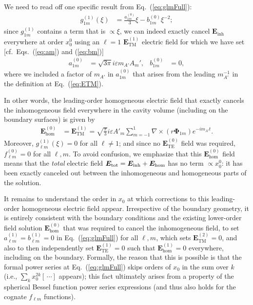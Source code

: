 \documentclass[amsmath,amssymb,aps,10pt,prd,letterpaper,nofootinbib,balancelastpage,notitlepage,superscriptaddress,twocolumn,floatfix]{revtex4-2}
\renewcommand{\eqref}[2][]{Eq{#1}.~(\ref{eq:#2})}	%
\begin{document}
We need to read off one specific result from \eqref{glmFull}:
\begin{align}
    g_{1m}^{(1)}(\xi) &= \frac{a_{1m}^{(0)}}{3} \xi - b_{1m}^{(0)} \xi^{-2};
\end{align}
since $g_{1m}^{(1)}$ contains a term that is $\propto \xi$, we can indeed exactly cancel $\bm E_\text{inh}$ everywhere at order $x_0^0$ using an $\ell = 1$ $\bm{E}_{\text{TM}}^{(1)}$ electric field for which we have set [cf.~\eqref[s]{am} and (\ref{eq:bm})]
\begin{align}
    a_{1m}^{(0)} &= \sqrt{3\pi} i\varepsilon m_{A'} A_m', & b_{1m}^{(0)} &= 0,\label{eq:coeffSoln0}
\end{align}
where we included a factor of $m_{A'}$ in $a_{1m}^{(0)}$ that arises from the leading $m_{A'}^{-1}$ in the definition at \eqref{ETM}.

In other words, the leading-order homogeneous electric field that exactly cancels the inhomogeneous field everywhere in the cavity volume (including on the boundary surfaces) is given by 
\begin{align}
    \bm E_\text{hom}^{(0)}&= \bm{E}_{\text{TM}}^{(1)}
    = \sqrt{\frac\pi3}i\varepsilon A'_m\sum_{m=-1}^1\nabla \times\left( r \bm\Phi_{1m}\right)e^{-im_{A'}t}.\label{eq:Ehom}
\end{align}
Moreover, $g_{\ell m}^{(1)}(\xi)=0$ for all $\ell\neq1$; and since no $\bm{E}_{\text{TE}}^{(0)}$ field was required, $f_{\ell m}^{(0)} = 0$ for all $\ell,m$.
To avoid confusion, we emphasize that this $\bm E_\text{hom}^{(0)}$ field means that the \emph{total} electric field $\bm{E_}{\text{tot}} = \bm{E}_\text{inh} + \bm{E}_\text{hom}$ has no term $\propto x_0^0$: it has been exactly canceled out between the inhomogeneous and homogeneous parts of the solution.

It remains to understand the order in $x_0$ at which corrections to this leading-order homogeneous electric field appear.
Irrespective of the boundary geometry, it is entirely consistent with the boundary conditions and the existing lower-order field solution $\bm{E}_{\text{hom}}^{(0)}$ that was required to cancel the inhomogeneous field, to set $a_{\ell m}^{(1)} = b_{\ell m}^{(1)} = 0$ in \eqref{glmFull} for all $\ell, m$, which sets $\bm{E}_{\text{TM}}^{(2)}=0$, and also to then independently set $\bm{E}_{\text{TE}}^{(1)} = 0$ such that $\bm{E}_{\text{hom}}^{(1)} = 0$ everywhere, including on the boundary.
Formally, the reason that this is possible is that the formal power series at \eqref{glmFull} skips orders of $x_0$ in the sum over $k$ (i.e., $\sum_k x_0^{2k} [\,\cdots]$ appears); this fact ultimately arises from a property of the spherical Bessel function power series expressions (and thus also holds for the cognate $f_{\ell m}$ functions).
\end{document}
